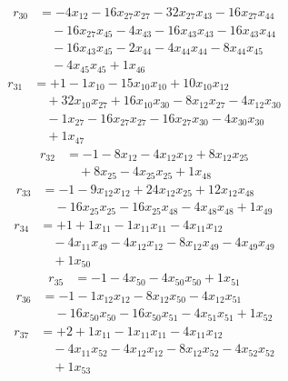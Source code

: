 \[\begin{aligned}
r_{30} &= - 4 x_{12} - 16 x_{27} x_{27} - 32 x_{27} x_{43} - 16 x_{27} x_{44} \\
 &\quad - 16 x_{27} x_{45} - 4 x_{43} - 16 x_{43} x_{43} - 16 x_{43} x_{44} \\
 &\quad - 16 x_{43} x_{45} - 2 x_{44} - 4 x_{44} x_{44} - 8 x_{44} x_{45} \\
 &\quad - 4 x_{45} x_{45} + 1 x_{46}
\end{aligned}\]
\[\begin{aligned}
r_{31} &= + 1 - 1 x_{10} - 15 x_{10} x_{10} + 10 x_{10} x_{12} \\
 &\quad + 32 x_{10} x_{27} + 16 x_{10} x_{30} - 8 x_{12} x_{27} - 4 x_{12} x_{30} \\
 &\quad - 1 x_{27} - 16 x_{27} x_{27} - 16 x_{27} x_{30} - 4 x_{30} x_{30} \\
 &\quad + 1 x_{47}
\end{aligned}\]
\[\begin{aligned}
r_{32} &= - 1 - 8 x_{12} - 4 x_{12} x_{12} + 8 x_{12} x_{25} \\
 &\quad + 8 x_{25} - 4 x_{25} x_{25} + 1 x_{48}
\end{aligned}\]
\[\begin{aligned}
r_{33} &= - 1 - 9 x_{12} x_{12} + 24 x_{12} x_{25} + 12 x_{12} x_{48} \\
 &\quad - 16 x_{25} x_{25} - 16 x_{25} x_{48} - 4 x_{48} x_{48} + 1 x_{49}
\end{aligned}\]
\[\begin{aligned}
r_{34} &= + 1 + 1 x_{11} - 1 x_{11} x_{11} - 4 x_{11} x_{12} \\
 &\quad - 4 x_{11} x_{49} - 4 x_{12} x_{12} - 8 x_{12} x_{49} - 4 x_{49} x_{49} \\
 &\quad + 1 x_{50}
\end{aligned}\]
\[\begin{aligned}
r_{35} &= - 1 - 4 x_{50} - 4 x_{50} x_{50} + 1 x_{51}
\end{aligned}\]
\[\begin{aligned}
r_{36} &= - 1 - 1 x_{12} x_{12} - 8 x_{12} x_{50} - 4 x_{12} x_{51} \\
 &\quad - 16 x_{50} x_{50} - 16 x_{50} x_{51} - 4 x_{51} x_{51} + 1 x_{52}
\end{aligned}\]
\[\begin{aligned}
r_{37} &= + 2 + 1 x_{11} - 1 x_{11} x_{11} - 4 x_{11} x_{12} \\
 &\quad - 4 x_{11} x_{52} - 4 x_{12} x_{12} - 8 x_{12} x_{52} - 4 x_{52} x_{52} \\
 &\quad + 1 x_{53}
\end{aligned}\]

